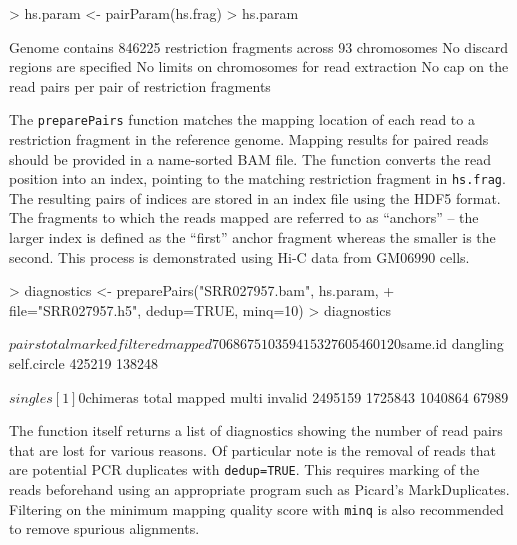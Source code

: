 \documentclass[12pt]{report}
\renewenvironment{Schunk}{\vspace{0pt}}{\vspace{0pt}}
\newcommand{\code}[1]{{\small\texttt{#1}}}
\begin{document}
\begin{Schunk}
\begin{Sinput}
> hs.param <- pairParam(hs.frag)
> hs.param
\end{Sinput}
\begin{Soutput}
Genome contains 846225 restriction fragments across 93 chromosomes
No discard regions are specified
No limits on chromosomes for read extraction
No cap on the read pairs per pair of restriction fragments
\end{Soutput}
\end{Schunk}

The \code{preparePairs} function matches the mapping location of each read to a restriction fragment in the reference genome.
Mapping results for paired reads should be provided in a name-sorted BAM file.
The function converts the read position into an index, pointing to the matching restriction fragment in \code{hs.frag}.
The resulting pairs of indices are stored in an index file using the HDF5 format.
The fragments to which the reads mapped are referred to as ``anchors'' -- the larger index is defined as the ``first'' anchor fragment whereas the smaller is the second.
This process is demonstrated using Hi-C data from GM06990 cells.

\begin{Schunk}
\begin{Sinput}
> diagnostics <- preparePairs("SRR027957.bam", hs.param, 
+     file="SRR027957.h5", dedup=TRUE, minq=10)
> diagnostics
\end{Sinput}
\begin{Soutput}
$pairs
   total   marked filtered   mapped 
 7068675   103594  1532760  5460120 

$same.id
   dangling self.circle 
     425219      138248 

$singles
[1] 0

$chimeras
  total  mapped   multi invalid 
2495159 1725843 1040864   67989 
\end{Soutput}
\end{Schunk}

The function itself returns a list of diagnostics showing the number of read pairs that are lost for various reasons.
Of particular note is the removal of reads that are potential PCR duplicates with \code{dedup=TRUE}.
This requires marking of the reads beforehand using an appropriate program such as Picard's \textsf{MarkDuplicates}.
Filtering on the minimum mapping quality score with \code{minq} is also recommended to remove spurious alignments.
\end{document}

